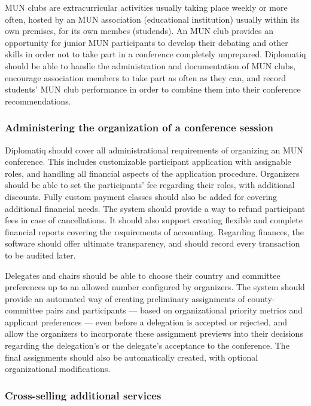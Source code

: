 MUN clubs are extracurricular activities usually taking place weekly or more often, hosted by an MUN association (educational institution) usually within its own premises, for its own membes (studends). An MUN club provides an opportunity for junior MUN participants to develop their debating and other skills in order not to take part in a conference completely unprepared. Diplomatiq should be able to handle the administration and documentation of MUN clubs, encourage association members to take part as often as they can, and record students' MUN club performance in order to combine them into their conference recommendations.

\subsubsection{Administering the organization of a conference session}

Diplomatiq should cover all administrational requirements of organizing an MUN conference. This includes customizable participant application with assignable roles, and handling all financial aspects of the application procedure. Organizers should be able to set the participants' fee regarding their roles, with additional discounts. Fully custom payment classes should also be added for covering additional financial needs. The system should provide a way to refund participant fees in case of cancellations. It should also support creating flexible and complete financial reports covering the requirements of accounting. Regarding finances, the software should offer ultimate transparency, and should record every transaction to be audited later.

Delegates and chairs should be able to choose their country and committee preferences up to an allowed number configured by organizers. The system should provide an automated way of creating preliminary assignments of county-committee pairs and participants — based on organizational priority metrics and applicant preferences — even before a delegation is accepted or rejected, and allow the organizers to incorporate these assignment previews into their decisions regarding the delegation's or the delegate's acceptance to the conference. The final assignments should also be automatically created, with optional organizational modifications.

\subsubsection{Cross-selling additional services}

